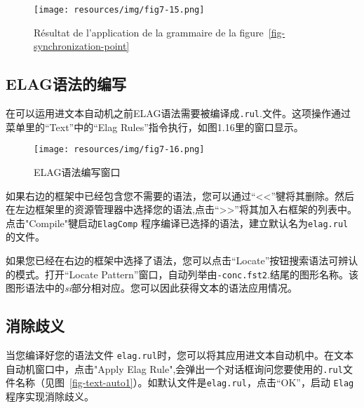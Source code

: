 \begin{figure}[!ht]
\begin{center}
\texttt{[image: resources/img/fig7-15.png]}
\caption{Résultat de l’application de la grammaire de la figure~\ref{fig-synchronization-point}\label{fig-est-il}}
\end{center}
\end{figure}

\subsection{ELAG语法的编写}

在可以运用进文本自动机之前ELAG语法需要被编译成\verb+.rul+.文件。这项操作通过菜单里的“Text”中的“Elag Rules”指令执行，如图1.16里的窗口显示。

\begin{figure}[!ht]
\begin{center}
\texttt{[image: resources/img/fig7-16.png]}
\caption{ELAG语法编写窗口\label{fig-elag-rules}}
\end{center}
\end{figure}

\bigskip
\noindent 

如果右边的框架中已经包含您不需要的语法，您可以通过“<<”犍将其删除。然后在左边框架里的资源管理器中选择您的语法,点击“>>”将其加入右框架的列表中。点击"Compile"犍启动\verb+ElagComp+
程序编译已选择的语法，建立默认名为\verb+elag.rul+ 的文件。


\bigskip
\noindent 如果您已经在右边的框架中选择了语法，您可以点击“Locate”按钮搜索语法可辨认的模式。打开“Locate Pattern”窗口，自动列举由\verb+-conc.fst2+.结尾的图形名称。该图形语法中的\textit{si}部分相对应。您可以因此获得文本的语法应用情况。



\bigskip

\subsection{消除歧义}
当您编译好您的语法文件 \verb+elag.rul+时，您可以将其应用进文本自动机中。在文本自动机窗口中，点击"Apply Elag Rule",会弹出一个对话框询问您要使用的\verb+.rul+文件名称（见图~\ref{fig-text-auto1}）。如默认文件是\verb+elag.rul+，点击“OK”，启动 \verb+Elag+程序实现消除歧义。


